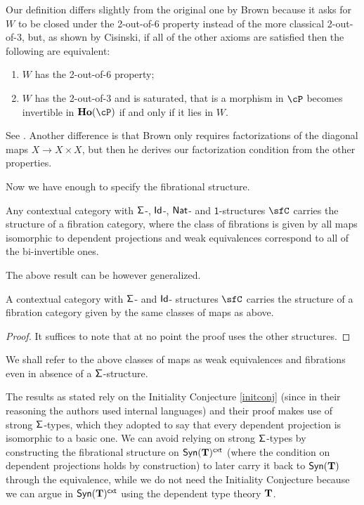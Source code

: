\begin{rmk}
  Our definition differs slightly from the original one by Brown
  because it asks for $W$ to be closed under the 2-out-of-6 property
  instead of the more classical 2-out-of-3, but, as shown by
  Cisinski, if all of
  the other axioms are satisfied then the following are equivalent:
  \begin{enumerate}
    \item $W$ has the 2-out-of-6 property;
    \item $W$ has the 2-out-of-3 and is saturated, that is a morphism in $\cP$
      becomes invertible in $\ho(\cP)$ if and only if it lies in $W$.
  \end{enumerate}
  See \cite[Thm.~7.2.7]{RB06}. Another difference is that Brown only requires
  factorizations of the diagonal maps $X\rightarrow X\times X$, but then he
  derives our factorization condition from the other properties.
\end{rmk}

\noindent
Now we have enough to specify the fibrational structure.

\begin{prop}
  Any contextual category with $\operatorname{\mathsf{\Sigma}}$-, $\operatorname{\mathsf{Id}}$-, $\operatorname{\mathsf{Nat}}$- and
  $\mathsf{1}$-structures $\sfC$ carries the structure of a fibration category,
  where the class of fibrations is given by all maps isomorphic to dependent
  projections and weak equivalences correspond to all of the bi-invertible ones.
\end{prop}

\noindent
The above result can be however generalized.

\begin{prop}\label{fibcat}
  A contextual category with $\operatorname{\mathsf{\Sigma}}$- and $\operatorname{\mathsf{Id}}$- structures $\sfC$ carries
  the structure of a fibration category given by the same classes of maps as
  above.
\end{prop}
\begin{proof}
  It suffices to note that at no point the proof uses the other structures.
\end{proof}

\begin{rmk}
  We shall refer to the above classes of maps as weak equivalences and
  fibrations even in absence of a $\operatorname{\mathsf{\Sigma}}$-structure.
\end{rmk}

\begin{rmk}
  The results as stated rely on the Initiality Conjecture \ref{initconj} (since
  in their reasoning the authors used internal languages) and their proof makes
  use of strong $\operatorname{\mathsf{\Sigma}}$-types, which they adopted to say that every dependent
  projection is isomorphic to a basic one. We
  can avoid relying on strong $\operatorname{\mathsf{\Sigma}}$-types by constructing the fibrational
  structure on $\mathsf{Syn}(\mathbf{T})^{\operatorname{\mathsf{cxt}}}$ (where the condition on dependent projections
  holds by construction) to later carry it back to $\mathsf{Syn}(\mathbf{T})$ through the
  equivalence, while we do not need the Initiality Conjecture because we can
  argue in $\mathsf{Syn}(\mathbf{T})^{\operatorname{\mathsf{cxt}}}$ using the dependent type theory $\operatorname{\mathbf{T}}$.
\end{rmk}

